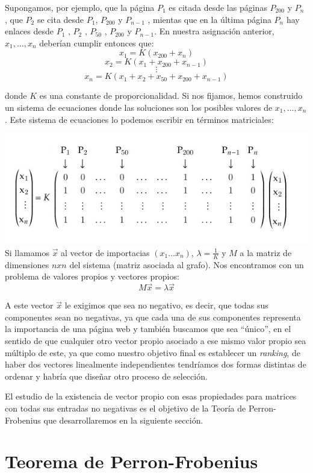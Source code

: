 \documentclass[size=a4, parskip=half, titlepage=false, toc=flat, toc=bib, 12pt, twoside]{scrartcl}
\theoremstyle{theorem-style}
\theoremstyle{definition-style}
\theoremstyle{remark-style}
\theoremstyle{example-style}
\theoremstyle{definition-style}
\theoremstyle{remark-style}
\begin{document}
Supongamos, por ejemplo, que la página $P_1$ es citada desde las páginas $P_{200}$ y $P_{n}$ ,
 que $P_2$ se cita desde $P_1$, $P_{200}$ y $P_{n-1}$ , mientas que en la última página $P_n$ hay enlaces desde $P_1$ , $P_2$ , $P_{50}$ , $P_{200}$ y $P_{n-1}$. En nuestra asignación anterior, $x_1, \dots , x_n$ deberían
 cumplir entonces que:
 $$ x_1 = K (x_{200} + x_n) $$
 $$ x_2 = K (x_1 + x_{200} + x_{n-1}) $$
 $$ \vdots $$
 $$x_n = K (x_1 + x_2 + x_{50} + x_{200} + x_{n-1}) $$

donde $K$ es una constante de proporcionalidad. Si nos fijamos, hemos construido un sistema de ecuaciones
donde las soluciones son los posibles valores de $x_1, \dots , x_n$. Este sistema de ecuaciones
lo podemos escribir en términos matriciales:

\includegraphics[width=1.0\textwidth]{./img/matrizejemplo}
Si llamamos $\vec{x}$ al vector de importacias $(x_1 \dots x_n)$, $\lambda = \frac{1}{K}$ y
$M$ a la matriz de dimensiones $n x n$ del sistema (matriz asociada al grafo). Nos encontramos
con un problema de valores propios y vectores propios:
$$M \vec{x} = \lambda \vec{x} $$

A este vector $\vec{x}$ le exigimos que sea no negativo, es decir, que todas sus componentes sean no negativas, ya que cada una de sus componentes representa la importancia de una página web y también buscamos que sea ``único'', en el sentido de que cualquier otro vector propio asociado a ese mismo valor propio sea múltiplo de este, ya que como nuestro objetivo final es establecer un \textit{ranking}, de haber dos vectores linealmente independientes tendríamos dos formas distintas de ordenar y habría que diseñar otro proceso de selección.

El estudio de la existencia de vector propio con esas propiedades para matrices con todas sus entradas no negativas es el objetivo de la Teoría de Perron-Frobenius que desarrollaremos en la siguiente sección.

\newpage

\section{Teorema de Perron-Frobenius}
\end{document}
